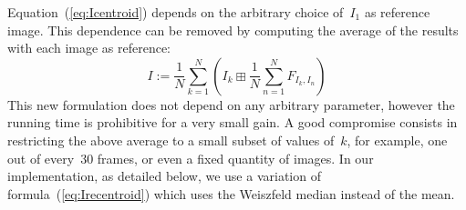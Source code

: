 \documentclass{ipol}
\begin{document}

Equation~(\ref{eq:Icentroid}) depends on the arbitrary choice of~$I_1$ as
reference image.  This dependence can be removed by computing the average of
the results with each image as reference:
\begin{equation}
	I:=\frac{1}{N}\sum_{k=1}^N\left(I_k\boxplus\frac{1}{N}\sum_{n=1}^NF_{I_k,I_n}\right)
	\label{eq:Irecentroid}
\end{equation}
This new formulation does not depend on any arbitrary parameter, however the
running time is prohibitive for a very small gain.  A good compromise consists
in restricting the above average to a small subset of values of~$k$, for
example, one out of every~$30$ frames, or even a fixed quantity of images.
In our implementation, as detailed below, we use a variation of
formula~(\ref{eq:Irecentroid}) which uses the Weiszfeld median instead
of the mean.
%

\end{document}
